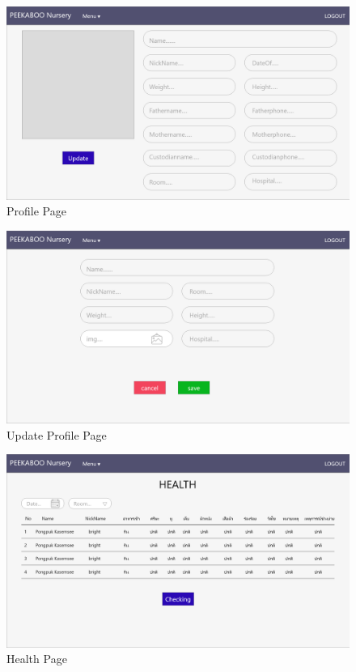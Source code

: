 \begin{figure}
  \begin{center}
  \includegraphics[width=\linewidth]{images/ProfileTwoPage.png}
  \end{center}
  \caption[Poem]{Profile Page}
  \label{fig:ProfileTwo}
  \end{figure}

\begin{figure}
  \begin{center}
  \includegraphics[width=\linewidth]{images/updateprofilePage.png}
  \end{center}
  \caption[Poem]{Update Profile Page}
  \label{fig:UpdateProfile}
  \end{figure}

\begin{figure}
  \begin{center}
  \includegraphics[width=\linewidth]{images/HealthPage.png}
  \end{center}
  \caption[Poem]{Health Page}
  \label{fig:Health}
  \end{figure}

